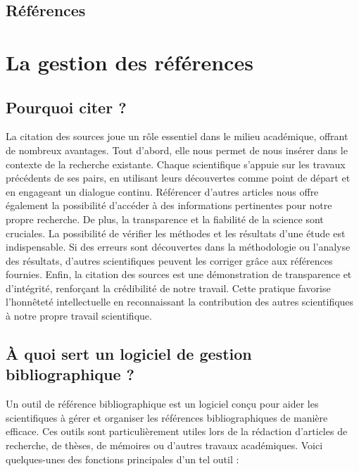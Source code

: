 \documentclass[
  letterpaper,
]{scrbook}
\begin{document}
\hypertarget{ruxe9fuxe9rences}{%
\section{Références}\label{ruxe9fuxe9rences}}


\hypertarget{sec-chap6}{%
\chapter{La gestion des références}\label{sec-chap6}}

\hypertarget{pourquoi-citer}{%
\section{Pourquoi citer ?}\label{pourquoi-citer}}

La citation des sources joue un rôle essentiel dans le milieu
académique, offrant de nombreux avantages. Tout d'abord, elle nous
permet de nous insérer dans le contexte de la recherche existante.
Chaque scientifique s'appuie sur les travaux précédents de ses pairs, en
utilisant leurs découvertes comme point de départ et en engageant un
dialogue continu. Référencer d'autres articles nous offre également la
possibilité d'accéder à des informations pertinentes pour notre propre
recherche. De plus, la transparence et la fiabilité de la science sont
cruciales. La possibilité de vérifier les méthodes et les résultats
d'une étude est indispensable. Si des erreurs sont découvertes dans la
méthodologie ou l'analyse des résultats, d'autres scientifiques peuvent
les corriger grâce aux références fournies. Enfin, la citation des
sources est une démonstration de transparence et d'intégrité, renforçant
la crédibilité de notre travail. Cette pratique favorise l'honnêteté
intellectuelle en reconnaissant la contribution des autres scientifiques
à notre propre travail scientifique.

\hypertarget{uxe0-quoi-sert-un-logiciel-de-gestion-bibliographique}{%
\section{À quoi sert un logiciel de gestion bibliographique
?}\label{uxe0-quoi-sert-un-logiciel-de-gestion-bibliographique}}

Un outil de référence bibliographique est un logiciel conçu pour aider
les scientifiques à gérer et organiser les références bibliographiques
de manière efficace. Ces outils sont particulièrement utiles lors de la
rédaction d'articles de recherche, de thèses, de mémoires ou d'autres
travaux académiques. Voici quelques-unes des fonctions principales d'un
tel outil :
\end{document}
